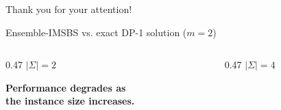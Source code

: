 \documentclass{beamer}
\begin{document}
\begin{frame}
	\begin{center}
		\Large
		Thank you for your attention!
	\end{center}
\end{frame}


\begin{frame}{Ensemble-IMSBS vs. exact DP-1 solution ($m=2$)}
	
	\begin{columns}[T,onlytextwidth]
		
		\begin{column}{0.47\textwidth}
			\centering
			{$|\Sigma|=2$}
			
			\vspace{0.3cm}
			
			\vspace{0.2cm}
			
			\textbf{\footnotesize{
					Performance degrades as\\
					the instance size increases.}}
		\end{column}
		
		\begin{column}{0.47\textwidth}
			\centering
			{$|\Sigma|=4$}
			
			\vspace{0.3cm}
			
			\vspace{0.2cm}
			

\end{column}
\end{columns}
\end{frame}
\end{document}
